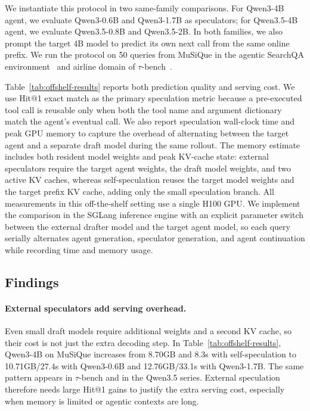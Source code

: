 We instantiate this protocol in two same-family comparisons. For Qwen3-4B agent, we
evaluate Qwen3-0.6B and Qwen3-1.7B as speculators; for Qwen3.5-4B agent, we
evaluate Qwen3.5-0.8B and Qwen3.5-2B. In both families, we also prompt the
target 4B model to predict its own next call from the same online prefix. 
We run the protocol on 50 queries from MuSiQue in the agentic SearchQA environment~\citep{jin2025searchr1} and airline domain of $\tau$-bench~\citep{yao2024taubench,barres2025tau2bench}.

Table~\ref{tab:offshelf-results} reports both prediction quality and serving
cost. We use Hit@1 exact match as the primary speculation metric because a
pre-executed tool call is reusable only when both the tool name and argument
dictionary match the agent's eventual call. We also report speculation
wall-clock time and peak GPU memory to capture the overhead of alternating
between the target agent and a separate draft model during the same rollout. The
memory estimate includes both resident model weights and peak KV-cache state:
external speculators require the target agent weights, the draft model weights,
and two active KV caches, whereas self-speculation reuses the target model
weights and the target prefix KV cache, adding only the small speculation branch.
All measurements in this off-the-shelf setting use a single H100 GPU. We
implement the comparison in the SGLang inference engine with an explicit
parameter switch between the external drafter model and the target agent model,
so each query serially alternates agent generation, speculator generation, and
agent continuation while recording time and memory usage.



\subsection{Findings}
\label{sec:empirical-self-speculate:findings}

\paragraph{External speculators add serving overhead.} Even small draft models
require additional weights and a second KV cache, so their cost is not just the
extra decoding step. In Table~\ref{tab:offshelf-results}, Qwen3-4B on MuSiQue
increases from 8.70GB and 8.3s with self-speculation to 10.71GB/27.4s with
Qwen3-0.6B and 12.76GB/33.1s with Qwen3-1.7B. The same pattern appears in
$\tau$-bench and in the Qwen3.5 series. External speculation therefore needs
large Hit@1 gains to justify the extra serving cost, especially when memory is
limited or agentic contexts are long.

